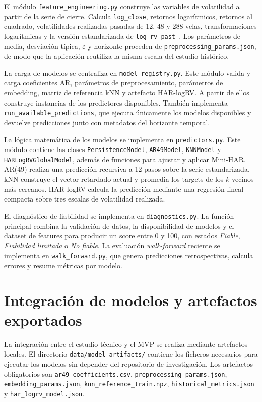 El módulo \texttt{feature\_\allowbreak engineering.py} construye las variables de volatilidad a partir de la serie de cierre. Calcula \texttt{log\_\allowbreak close}, retornos logarítmicos, retornos al cuadrado, volatilidades realizadas pasadas de 12, 48 y 288 velas, transformaciones logarítmicas y la versión estandarizada de \texttt{log\_\allowbreak rv\_\allowbreak past\_}. Los parámetros de media, desviación típica, \(\varepsilon\) y horizonte proceden de \texttt{preprocessing\_\allowbreak params.json}, de modo que la aplicación reutiliza la misma escala del estudio histórico.

La carga de modelos se centraliza en \texttt{model\_\allowbreak registry.py}. Este módulo valida y carga coeficientes AR, parámetros de preprocesamiento, parámetros de embedding, matriz de referencia kNN y artefacto HAR-logRV. A partir de ellos construye instancias de los predictores disponibles. También implementa \texttt{run\_\allowbreak available\_\allowbreak predictions}, que ejecuta únicamente los modelos disponibles y devuelve predicciones junto con metadatos del horizonte temporal.

La lógica matemática de los modelos se implementa en \texttt{predictors.py}. Este módulo contiene las clases \texttt{PersistenceModel}, \texttt{AR49Model}, \texttt{KNNModel} y \texttt{HARLogRVGlobalModel}, además de funciones para ajustar y aplicar Mini-HAR. AR(49) realiza una predicción recursiva a 12 pasos sobre la serie estandarizada. kNN construye el vector retardado actual y promedia los targets de los \(k\) vecinos más cercanos. HAR-logRV calcula la predicción mediante una regresión lineal compacta sobre tres escalas de volatilidad realizada.

El diagnóstico de fiabilidad se implementa en \texttt{diagnostics.py}. La función principal combina la validación de datos, la disponibilidad de modelos y el dataset de features para producir un score entre 0 y 100, con estados \textit{Fiable}, \textit{Fiabilidad limitada} o \textit{No fiable}. La evaluación \textit{walk-forward} reciente se implementa en \texttt{walk\_\allowbreak forward.py}, que genera predicciones retrospectivas, calcula errores y resume métricas por modelo.

\section{Integración de modelos y artefactos exportados}\label{sec:integracion-modelos-artefactos}

La integración entre el estudio técnico y el MVP se realiza mediante artefactos locales. El directorio \texttt{data/\allowbreak model\_\allowbreak artifacts/} contiene los ficheros necesarios para ejecutar los modelos sin depender del repositorio de investigación. Los artefactos obligatorios son \texttt{ar49\_\allowbreak coefficients.csv}, \texttt{preprocessing\_\allowbreak params.json}, \texttt{embedding\_\allowbreak params.json}, \texttt{knn\_\allowbreak reference\_\allowbreak train.npz}, \texttt{historical\_\allowbreak metrics.json} y \texttt{har\_\allowbreak logrv\_\allowbreak model.json}.

